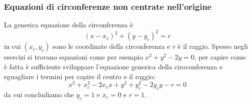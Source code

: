 \subsubsection{Equazioni di circonferenze non centrate nell'origine}
La generica equazione della circonferenza è
\[
    (x-x_c)^2 + (y-y_c)^2 = r
\]
in cui $(x_c, y_c)$ sono le coordinate della circonferenza e $r$ è il raggio.\newline
\newline
Spesso negli esercizi si trovano equazioni come per esempio $x^2 + y^2 -2y = 0$, per capire come è fatta è sufficiente sviluppare l'equazione generica della ciroconferenza e eguagliare i termini per capire il centro e il raggio:
\[
    x^2 + x_c^2 -2x_cx + y^2 + y_c^2 - 2y_cy - r = 0
\]
da cui concludiamo che $y_c = 1$ e $x_c = 0$ e $r=1$.